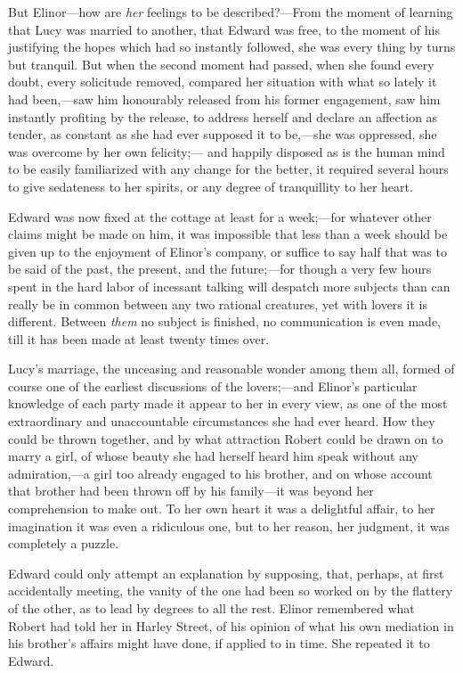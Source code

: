 But Elinor---how are \emph{her} feelings to be described?---From
the moment of learning that Lucy was married to another,
that Edward was free, to the moment of his justifying
the hopes which had so instantly followed, she was every
thing by turns but tranquil.  But when the second moment
had passed, when she found every doubt, every solicitude
removed, compared her situation with what so lately it
had been,---saw him honourably released from his former
engagement, saw him instantly profiting by the release,
to address herself and declare an affection as tender,
as constant as she had ever supposed it to be,---she
was oppressed, she was overcome by her own felicity;---%
and happily disposed as is the human mind to be easily
familiarized with any change for the better, it required
several hours to give sedateness to her spirits, or any
degree of tranquillity to her heart.

Edward was now fixed at the cottage at least for
a week;---for whatever other claims might be made on him,
it was impossible that less than a week should be given
up to the enjoyment of Elinor's company, or suffice
to say half that was to be said of the past, the present,
and the future;---for though a very few hours spent in
the hard labor of incessant talking will despatch more
subjects than can really be in common between any two
rational creatures, yet with lovers it is different.
Between \emph{them} no subject is finished, no communication
is even made, till it has been made at least twenty
times over.

Lucy's marriage, the unceasing and reasonable wonder
among them all, formed of course one of the earliest
discussions of the lovers;---and Elinor's particular knowledge
of each party made it appear to her in every view, as one
of the most extraordinary and unaccountable circumstances
she had ever heard.  How they could be thrown together,
and by what attraction Robert could be drawn on to marry
a girl, of whose beauty she had herself heard him speak
without any admiration,---a girl too already engaged
to his brother, and on whose account that brother had been
thrown off by his family---it was beyond her comprehension
to make out.  To her own heart it was a delightful affair,
to her imagination it was even a ridiculous one, but
to her reason, her judgment, it was completely a puzzle.

Edward could only attempt an explanation by supposing,
that, perhaps, at first accidentally meeting, the vanity
of the one had been so worked on by the flattery
of the other, as to lead by degrees to all the rest.
Elinor remembered what Robert had told her in Harley Street,
of his opinion of what his own mediation in his brother's
affairs might have done, if applied to in time.
She repeated it to Edward.

